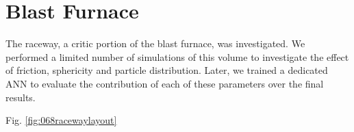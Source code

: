 
\chapter{Blast Furnace}
\label{cap:blastfurnace}

The raceway, a critic portion of the blast furnace, was investigated. We
performed a limited number of simulations of this volume to investigate the
effect of friction, sphericity and particle distribution.
Later, we trained a dedicated \acs{ANN} to evaluate the contribution of each of
these parameters over the final results.

Fig. \ref{fig:068racewaylayout}
